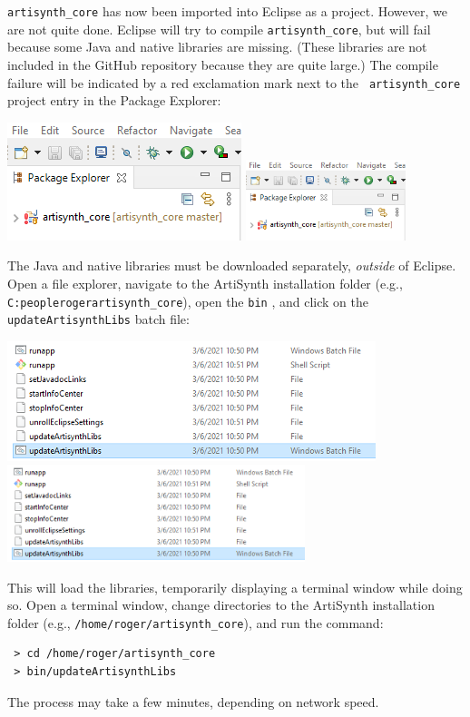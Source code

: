 {\tt artisynth\_core} has now been imported into Eclipse as a
project. However, we are not quite done. Eclipse will try to compile
{\tt artisynth\_core}, but will fail because some Java and native
libraries are missing. (These libraries are not included in the
GitHub repository because they are quite large.) The compile failure
will be indicated by a red exclamation mark next to the {\tt
artisynth\_core} project entry in the Package Explorer:
%
\begin{center}
\iflatexml
   \includegraphics[]{images/artisynthBuildError}
\else
   \includegraphics[width=0.35\textwidth]{images/artisynthBuildError}
\fi
\end{center}
%
The Java and native libraries must be downloaded separately, {\it
outside} of Eclipse.  
\ifWindows
Open a file explorer, navigate to the ArtiSynth installation folder
(e.g., {\tt C:\BKS people\BKS roger\BKS artisynth\_core}), open the
{\tt bin} \directory{}, and click on the {\tt updateArtisynthLibs}
batch file:
\begin{center}
\iflatexml
   \includegraphics[]{images/UpdateArtisynthLibs}
\else
   \includegraphics[width=0.65\textwidth]{images/UpdateArtisynthLibs}
\fi
\end{center}
This will load the libraries, temporarily displaying a terminal window
while doing so.
\else
Open a terminal window, change directories to the ArtiSynth
installation folder (e.g., {\tt /home/roger/artisynth\_core}), and run the
command:
\begin{verbatim}
 > cd /home/roger/artisynth_core
 > bin/updateArtisynthLibs
\end{verbatim}
\fi
The process may take a few minutes, depending on network speed.

